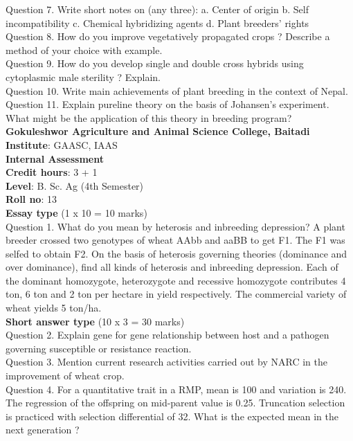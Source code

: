 \documentclass[12pt]{article}\usepackage[]{graphicx}\usepackage[]{color}
\begin{document}
Question 7. Write short notes on (any three): a. Center of origin b. Self incompatibility c. Chemical hybridizing agents d. Plant breeders' rights\\
Question 8. How do you improve vegetatively propagated crops ? Describe a method of your choice with example.\\
Question 9. How do you develop single and double cross hybrids using cytoplasmic male sterility ? Explain.\\
Question 10. Write main achievements of plant breeding in the context of Nepal.\\
Question 11. Explain pureline theory on the basis of Johansen's experiment. What might be the application of this theory in breeding program?\\
\clearpage 
{\centering \Large{\textbf{Gokuleshwor Agriculture and Animal Science College, Baitadi}} \\[0.25cm]
            \textbf{Institute}: GAASC, IAAS \\[0.2cm]
            \textbf{Internal Assessment} \\[0.2cm]} 
\textbf{Credit hours}: 3 + 1 \\ 
\textbf{Level}: B. Sc. Ag (4th Semester) \\
\textbf{Roll no}: 13 \\[0.5cm] 
\textbf{Essay type} (1 x 10 = 10 marks) \\
Question 1. What do you mean by heterosis and inbreeding depression? A plant breeder crossed two genotypes of wheat AAbb and aaBB to get F1. The F1 was selfed to obtain F2. On the basis of heterosis governing theories (dominance and over dominance), find all kinds of heterosis and inbreeding depression. Each of the dominant homozygote, heterozygote and recessive homozygote contributes 4 ton, 6 ton and 2 ton per hectare in yield respectively. The commercial variety of wheat yields 5 ton/ha.\\
\textbf{Short answer type} (10 x 3 = 30 marks) \\
Question 2. Explain gene for gene relationship between host and a pathogen governing susceptible or resistance reaction.\\
Question 3. Mention current research activities carried out by NARC in the improvement of wheat crop.\\
Question 4. For a quantitative trait in a RMP, mean is 100 and variation is 240. The regression of the offspring on mid-parent value is 0.25. Truncation selection is practiced with selection differential of 32. What is the expected mean in the next generation ?\\
\end{document}
